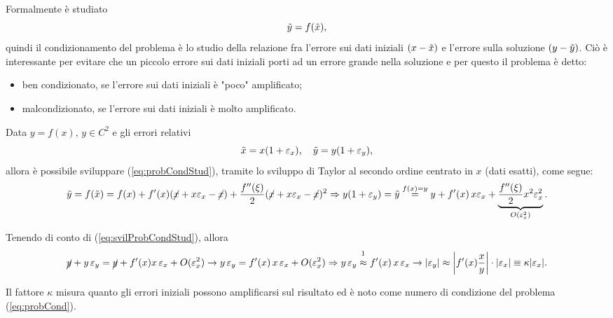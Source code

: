 Formalmente è studiato
\begin{equation}\label{eq:probCondStud}
    \Tilde{y}=f(\Tilde{x}),
\end{equation}
quindi il condizionamento del problema è lo studio della relazione fra l'errore sui dati iniziali $(x-\Tilde{x})$ e l'errore sulla soluzione $(y-\Tilde{y})$. Ciò è interessante per evitare che un piccolo errore sui dati iniziali porti ad un errore grande nella soluzione e per questo il problema è detto:
\begin{itemize}
    \item ben condizionato, se l'errore sui dati iniziali è "poco" amplificato;
    \item malcondizionato, se l'errore sui dati iniziali è molto amplificato.
\end{itemize}

Data $y=f(x),\, y\in C^2$ e gli errori relativi \begin{equation*}
    \Tilde{x}=x(1+\varepsilon_x),\quad \Tilde{y}=y(1+\varepsilon_y),
\end{equation*}
allora è possibile sviluppare (\ref{eq:probCondStud}), tramite lo sviluppo di Taylor al secondo ordine centrato in $x$ (dati esatti), come segue:
\begin{equation}\label{eq:svilProbCondStud}
    \Tilde{y}=f(\Tilde{x})=f(x)+f'(x)(\cancel{x}+x\varepsilon_x-\cancel{x})+\frac{f''(\xi)}{2}(\cancel{x}+x\varepsilon_x-\cancel{x})^2\Rightarrow y(1+\varepsilon_y)=\Tilde{y}\overset{f(x)=y}{=}y+f'(x)\, x\varepsilon_x+\underbrace{\frac{f''(\xi)}{2}x^2\varepsilon_x^2}_{O(\varepsilon_x^2)}.
\end{equation}

Tenendo di conto di (\ref{eq:svilProbCondStud}), allora
\begin{equation*}
    \cancel{y}+y\,\varepsilon_y=\cancel{y}+f'(x)x\,\varepsilon_x+O(\varepsilon_x^2)\rightarrow y\,\varepsilon_y=f'(x)\,x\,\varepsilon_x+O(\varepsilon_x^2)\Rightarrow y\,\varepsilon_y \overset{\footnotemark}{\approx}f'(x)\,x\,\varepsilon_x \rightarrow |\varepsilon_y|\approx \left|f'(x)\frac{x}{y}\right|\cdot|\varepsilon_x|\equiv\kappa |\varepsilon_x|.
\end{equation*}


\begin{definition}
    Il fattore $\kappa$ misura quanto gli errori iniziali possono amplificarsi sul risultato ed è noto come numero di condizione del problema (\ref{eq:probCond}).
\end{definition}

